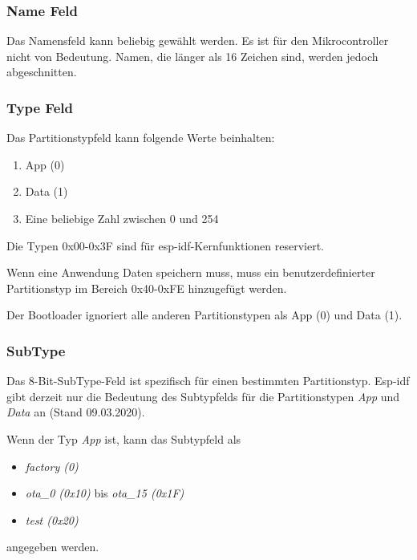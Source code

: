 \subsubsection{Name Feld}
Das Namensfeld kann beliebig gewählt werden. Es ist für den Mikrocontroller nicht von Bedeutung. Namen, die länger als 16 Zeichen sind, werden jedoch abgeschnitten.

\subsubsection{Type Feld}
Das Partitionstypfeld kann folgende Werte beinhalten:

\begin{enumerate}
    \item App (0)
    \item Data (1)
    \item Eine beliebige Zahl zwischen 0 und 254
\end{enumerate}

Die Typen 0x00-0x3F sind für esp-idf-Kernfunktionen reserviert.

Wenn eine Anwendung Daten speichern muss, muss ein benutzerdefinierter Partitionstyp im Bereich 0x40-0xFE hinzugefügt werden.

Der Bootloader ignoriert alle anderen Partitionstypen als App (0) und Data (1).

\subsubsection{SubType}
Das 8-Bit-SubType-Feld ist spezifisch für einen bestimmten Partitionstyp. Esp-idf gibt derzeit nur die Bedeutung des Subtypfelds für die Partitionstypen \textit{App} und \textit{Data} an (Stand 09.03.2020).

Wenn der Typ \textit{App} ist, kann das Subtypfeld als
\begin{itemize}
    \item \textit{factory (0)}
    \item \textit{ota\_0 (0x10)} bis \textit{ota\_15 (0x1F)}
    \item \textit{test (0x20)}
\end{itemize}
angegeben werden.

